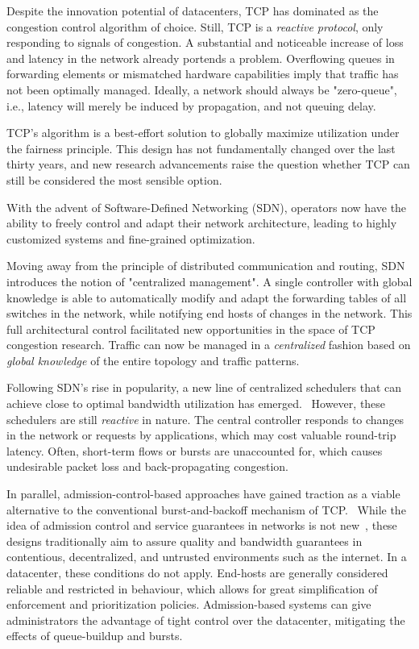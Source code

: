Despite the innovation potential of datacenters, TCP has dominated as 
the congestion control algorithm of choice.
Still, TCP is a \textit{reactive protocol}, only responding to signals of 
congestion. A substantial and noticeable increase of loss and latency in the 
network already portends a problem. Overflowing queues in forwarding elements 
or mismatched hardware capabilities imply that traffic has not been optimally 
managed.
Ideally, a network should always be "zero-queue", i.e., latency 
will merely be induced by propagation, and not queuing delay.

TCP's algorithm is a best-effort solution to globally maximize utilization 
under the fairness principle. This design has not fundamentally changed 
over the last thirty years, and new research advancements raise the question whether TCP
can still be considered the most sensible option.~\cite{pcc,bbr,perc}

With the advent of Software-Defined Networking (SDN), operators now have the 
ability to freely control and adapt their network architecture, leading to 
highly customized systems and fine-grained optimization.~\cite{sdn_road}

Moving away from the principle of distributed communication and routing, SDN 
introduces the notion of "centralized management". A single controller with 
global knowledge is able to automatically modify and adapt the forwarding 
tables of all switches in the network, while notifying end hosts of changes in 
the network.
This full architectural control facilitated new opportunities in the space of 
TCP congestion research. Traffic can now be managed in a  \textit{centralized} 
fashion based on \textit{global knowledge} of the entire topology and traffic 
patterns.

Following SDN's rise in popularity, a new line of centralized schedulers that 
can achieve close to optimal bandwidth utilization has emerged.~\cite{hedera, 
fastpass, microte, b4, dionysus}
However, these schedulers are still \textit{reactive} in nature. The central 
controller responds to changes in the network or requests by applications, 
which may cost valuable round-trip latency. Often, short-term flows or bursts 
are unaccounted for, which causes undesirable packet loss and back-propagating 
congestion.~\cite{perc}

In parallel, admission-control-based approaches have gained traction as a 
viable alternative to the conventional burst-and-backoff mechanism of 
TCP.~\cite{expresspass, fastpass, perc}
While the idea of admission control and service guarantees in networks is not 
new~\cite{access_limit, access_limit2}, these designs traditionally 
aim to assure quality and bandwidth guarantees in contentious, decentralized, 
and untrusted environments such as the internet. In a datacenter, these 
conditions do not apply. End-hosts are generally considered reliable and 
restricted in behaviour, which allows for great simplification of enforcement 
and prioritization policies. Admission-based systems can give administrators 
the advantage of tight control over the datacenter, mitigating the effects of 
queue-buildup and bursts.

